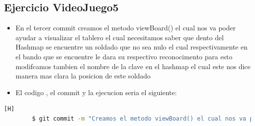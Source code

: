 \documentclass{article}
\begin{document}
	\subsection{Ejercicio VideoJuego5}
	\begin{itemize}	
		\item En el tercer commit creamos el metodo viewBoard() el cual nos va poder ayudar a visualizar el tablero el cual necesitamos saber que dento del Hashmap se encuentre un soldado que no sea nulo el cual respectivamente en el bando que se encuentre le dara su respectivo reconocimento para esto modifcamos tambien el nombre de la clave en el hashmap el cual este nos dice manera mas clara la posicion de este soldado 
		\item El codigo , el commit y la ejecucion seria el siguiente:
	\end{itemize}	
	\begin{lstlisting}[language=bash,caption={Commit}][H]
		$ git commit -m "Creamos el metodo viewBoard() el cual nos va poder ayudar a visualizar el tablero el cual necesitamos saber que dento del Hashmap se encuentre un soldado que no sea nulo el cual respectivamente en el bando que se encuentre le dara su respectivo reconocimento para esto modifcamos tambien el nombre de la clave en el hashmap el cual este nos dice manera mas clara la posicion de este soldado"
	\end{lstlisting}	
\end{document}
